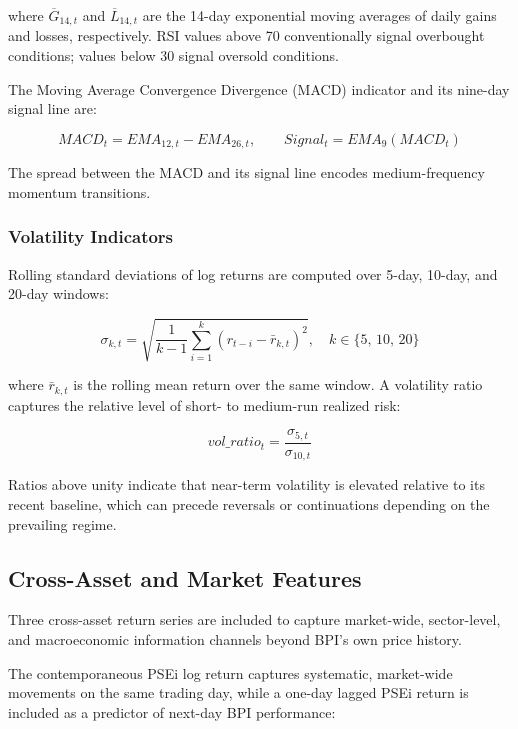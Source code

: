 \documentclass[12pt]{article}
\begin{document}
where $\overline{G}_{14,t}$ and $\overline{L}_{14,t}$ are the 14-day exponential moving averages of daily gains and losses, respectively. RSI values above 70 conventionally signal overbought conditions; values below 30 signal oversold conditions.

The Moving Average Convergence Divergence (MACD) indicator and its nine-day signal line are:

\begin{equation}
    MACD_t = EMA_{12,t} - EMA_{26,t}, \qquad Signal_t = EMA_9(MACD_t)
\end{equation}

The spread between the MACD and its signal line encodes medium-frequency momentum transitions.

\subsubsection*{Volatility Indicators}

Rolling standard deviations of log returns are computed over 5-day, 10-day, and 20-day windows:

\begin{equation}
    \sigma_{k,t} = \sqrt{\frac{1}{k-1}\sum_{i=1}^{k}\left(r_{t-i} - \bar{r}_{k,t}\right)^2}, \quad k \in \{5,\, 10,\, 20\}
\end{equation}

where $\bar{r}_{k,t}$ is the rolling mean return over the same window. A volatility ratio captures the relative level of short- to medium-run realized risk:

\begin{equation}
    vol\_ratio_t = \frac{\sigma_{5,t}}{\sigma_{10,t}}
\end{equation}

Ratios above unity indicate that near-term volatility is elevated relative to its recent baseline, which can precede reversals or continuations depending on the prevailing regime.

\subsection{Cross-Asset and Market Features}

Three cross-asset return series are included to capture market-wide, sector-level, and macroeconomic information channels beyond BPI's own price history.

The contemporaneous PSEi log return captures systematic, market-wide movements on the same trading day, while a one-day lagged PSEi return is included as a predictor of next-day BPI performance:
\end{document}
